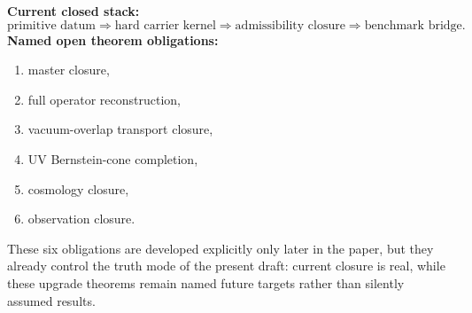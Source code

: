 \documentclass[11pt,a4paper]{article}
\theoremstyle{definition}
\theoremstyle{remark}
\begin{document}
\begin{tcolorbox}[colback=orange!4, colframe=orange!65!black, breakable,
    title={\textbf{Current closed stack and named open theorem obligations}}, fonttitle=\bfseries]
\textbf{Current closed stack:}
\[
\text{primitive datum}
\Longrightarrow
\text{hard carrier kernel}
\Longrightarrow
\text{admissibility closure}
\Longrightarrow
\text{benchmark bridge}.
\]
\textbf{Named open theorem obligations:}
\begin{enumerate}[label=\textbf{O\arabic*:}, leftmargin=1.7em, topsep=3pt, itemsep=2pt]
    \item master closure,
    \item full operator reconstruction,
    \item vacuum-overlap transport closure,
    \item UV Bernstein-cone completion,
    \item cosmology closure,
    \item observation closure.
\end{enumerate}
These six obligations are developed explicitly only later in the paper, but they already control the truth mode of the present draft: current closure is real, while these upgrade theorems remain named future targets rather than silently assumed results.
\end{tcolorbox}
\end{document}
